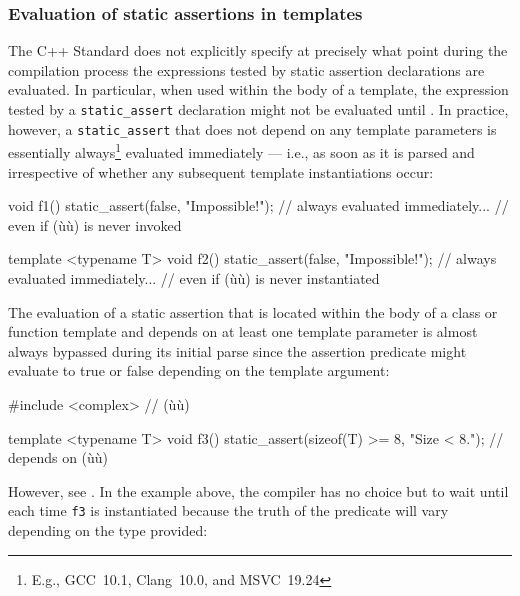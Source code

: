 \subsubsection[Evaluation of static assertions in templates]{Evaluation of static assertions in templates}\label{evaluation-of-static-assertions-in-templates}

The C++ Standard does not explicitly specify at precisely what point during
the compilation process the expressions tested by static assertion declarations are
evaluated. In particular, when used within the body of a template, the expression tested by a
\lstinline!static_assert! declaration might not be evaluated until
. In practice, however, a
\lstinline!static_assert! that does not depend on any template parameters
is essentially always{\cprotect\footnote{E.g.,
GCC~10.1, Clang~10.0, and MSVC~19.24}} evaluated immediately --- i.e., as
soon as it is parsed and irrespective of whether any subsequent template
instantiations occur:

\begin{emcppslisting}[emcppserrorlines={3,9}]
void f1()
{
    static_assert(false, "Impossible!");  // always evaluated immediately...
}                                         // even if (ù{}ù) is never invoked

template <typename T>
void f2()
{
    static_assert(false, "Impossible!");  // always evaluated immediately...
}                                         // even if (ù{}ù) is never instantiated
\end{emcppslisting}

\noindent The evaluation of a static assertion that is located within the
body of a class or function template and depends on at least one
template parameter is almost always bypassed during its initial parse since
the assertion predicate might evaluate to true or false depending on the template argument:

\begin{emcppshiddenlisting}[emcppsbatch=e2]
#include <complex>  // (ù{}ù)
\end{emcppshiddenlisting}
\begin{emcppslisting}[emcppsbatch=e2]
template <typename T>
void f3()
{
    static_assert(sizeof(T) >= 8, "Size < 8.");  // depends on (ù{}ù)
}
\end{emcppslisting}

\noindent However, see
.
In the example above, the compiler has no choice but to wait until each
time \lstinline!f3! is instantiated because the truth of the predicate will
vary depending on the type provided:

